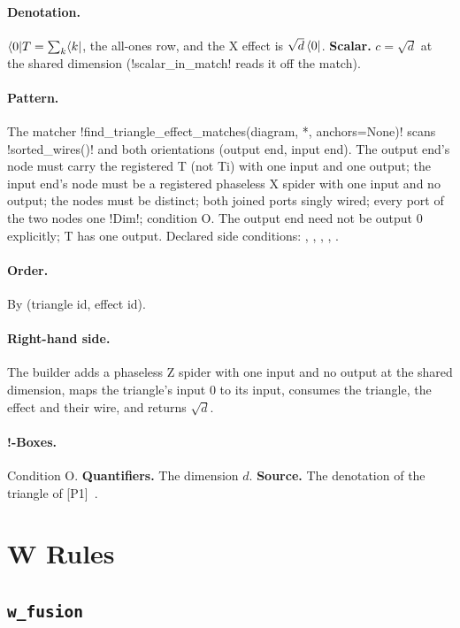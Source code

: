 \paragraph{Denotation.} $\langle 0 \rvert T=\sum_k\langle k \rvert$, the all-ones row, and the X effect is $\sqrt d\,\langle 0 \rvert$. \textbf{Scalar.} $c=\sqrt d$ at the shared dimension (\py!scalar_in_match! reads it off the match).

\paragraph{Pattern.} The matcher \py!find_triangle_effect_matches(diagram, *, anchors=None)! scans \py!sorted_wires()! and both orientations (output end, input end). The output end's node must carry the registered T (not Ti) with one input and one output; the input end's node must be a registered phaseless X spider with one input and no output; the nodes must be distinct; both joined ports singly wired; every port of the two nodes one \py!Dim!; condition O. The output end need not be output 0 explicitly; T has one output. Declared side conditions: , , , , .

\paragraph{Order.} By (triangle id, effect id).

\paragraph{Right-hand side.} The builder adds a phaseless Z spider with one input and no output at the shared dimension, maps the triangle's input 0 to its input, consumes the triangle, the effect and their wire, and returns $\sqrt d$.

\paragraph{!-Boxes.} Condition O. \textbf{Quantifiers.} The dimension $d$. \textbf{Source.} The denotation of the triangle of [P1]~\cite{poor2023zxw}.

\section{W Rules}\label{sec:rules-w}

\subsection{\texttt{w\_fusion}}\label{sec:rules-w-fusion}

